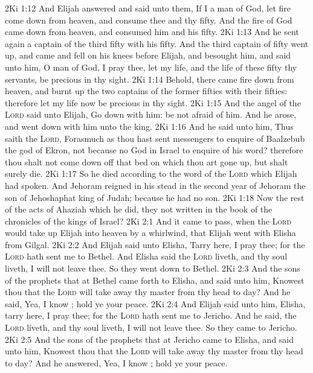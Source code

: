 \vs 2Ki 1:12 And Elijah answered and said unto them, If I  a man of God, let fire come down from heaven, and consume thee and thy fifty. And the fire of God came down from heaven, and consumed him and his fifty.
\vs 2Ki 1:13 And he sent again a captain of the third fifty with his fifty. And the third captain of fifty went up, and came and fell on his knees before Elijah, and besought him, and said unto him, O man of God, I pray thee, let my life, and the life of these fifty thy servants, be precious in thy sight.
\vs 2Ki 1:14 Behold, there came fire down from heaven, and burnt up the two captains of the former fifties with their fifties: therefore let my life now be precious in thy sight.
\vs 2Ki 1:15 And the angel of the \textsc{Lord} said unto Elijah, Go down with him: be not afraid of him. And he arose, and went down with him unto the king.
\vs 2Ki 1:16 And he said unto him, Thus saith the \textsc{Lord}, Forasmuch as thou hast sent messengers to enquire of Baalzebub the god of Ekron,  not because  no God in Israel to enquire of his word? therefore thou shalt not come down off that bed on which thou art gone up, but shalt surely die.
\vs 2Ki 1:17 So he died according to the word of the \textsc{Lord} which Elijah had spoken. And Jehoram reigned in his stead in the second year of Jehoram the son of Jehoshaphat king of Judah; because he had no son.
\vs 2Ki 1:18 Now the rest of the acts of Ahaziah which he did,  they not written in the book of the chronicles of the kings of Israel?
\vs 2Ki 2:1 And it came to pass, when the \textsc{Lord} would take up Elijah into heaven by a whirlwind, that Elijah went with Elisha from Gilgal.
\vs 2Ki 2:2 And Elijah said unto Elisha, Tarry here, I pray thee; for the \textsc{Lord} hath sent me to Bethel. And Elisha said  the \textsc{Lord} liveth, and  thy soul liveth, I will not leave thee. So they went down to Bethel.
\vs 2Ki 2:3 And the sons of the prophets that  at Bethel came forth to Elisha, and said unto him, Knowest thou that the \textsc{Lord} will take away thy master from thy head to day? And he said, Yea, I know ; hold ye your peace.
\vs 2Ki 2:4 And Elijah said unto him, Elisha, tarry here, I pray thee; for the \textsc{Lord} hath sent me to Jericho. And he said,  the \textsc{Lord} liveth, and  thy soul liveth, I will not leave thee. So they came to Jericho.
\vs 2Ki 2:5 And the sons of the prophets that  at Jericho came to Elisha, and said unto him, Knowest thou that the \textsc{Lord} will take away thy master from thy head to day? And he answered, Yea, I know ; hold ye your peace.

